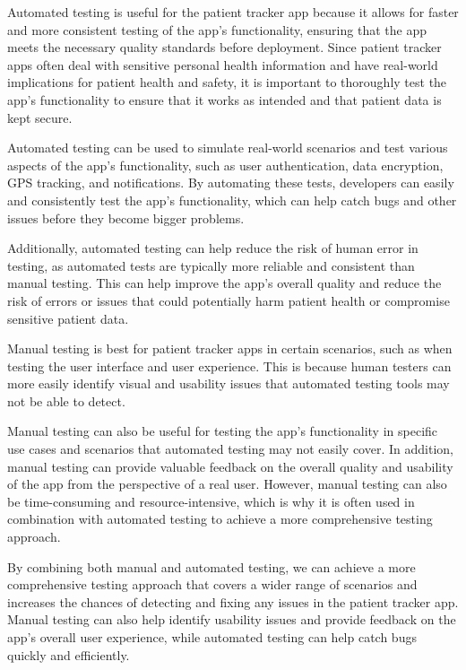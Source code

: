 \documentclass[12pt]{article}
\begin{document}
\begin{itemize}
			\quad Automated testing is useful for the patient tracker app because it allows for faster and more consistent testing of the app's functionality, ensuring that the app meets the necessary quality standards before deployment. Since patient tracker apps often deal with sensitive personal health information and have real-world implications for patient health and safety, it is important to thoroughly test the app's functionality to ensure that it works as intended and that patient data is kept secure.
			
			\quad Automated testing can be used to simulate real-world scenarios and test various aspects of the app's functionality, such as user authentication, data encryption, GPS tracking, and notifications. By automating these tests, developers can easily and consistently test the app's functionality, which can help catch bugs and other issues before they become bigger problems.
			
			\quad Additionally, automated testing can help reduce the risk of human error in testing, as automated tests are typically more reliable and consistent than manual testing. This can help improve the app's overall quality and reduce the risk of errors or issues that could potentially harm patient health or compromise sensitive patient data.
			
			
			\quad Manual testing is best for patient tracker apps in certain scenarios, such as when testing the user interface and user experience. This is because human testers can more easily identify visual and usability issues that automated testing tools may not be able to detect. 
			
			\quad Manual testing can also be useful for testing the app's functionality in specific use cases and scenarios that automated testing may not easily cover. In addition, manual testing can provide valuable feedback on the overall quality and usability of the app from the perspective of a real user. However, manual testing can also be time-consuming and resource-intensive, which is why it is often used in combination with automated testing to achieve a more comprehensive testing approach.
			
			
			
			\quad By combining both manual and automated testing, we can achieve a more comprehensive testing approach that covers a wider range of scenarios and increases the chances of detecting and fixing any issues in the patient tracker app. Manual testing can also help identify usability issues and provide feedback on the app's overall user experience, while automated testing can help catch bugs quickly and efficiently.
			
			
			\end{itemize}
\end{document}
